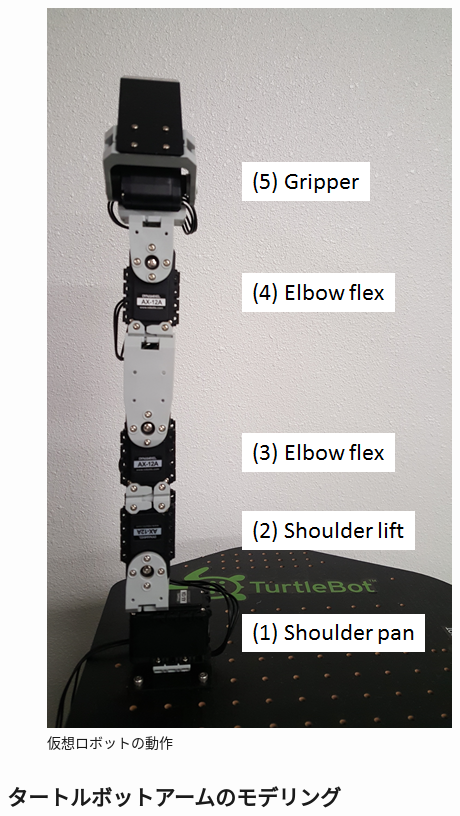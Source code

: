 \begin{figure}[ht]
  \centering
  \includegraphics[width=\columnwidth]{pictures/chapter11/pic_11_10.png}
  \caption{仮想ロボットの動作}
\end{figure}

\subsection{タートルボットアームのモデリング}

